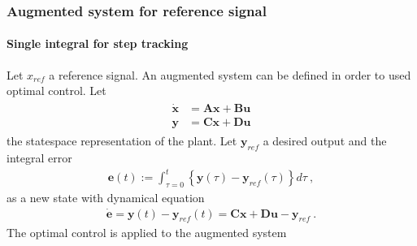 \documentclass[letterpaper,10pt,english]{jupyterBook}
\begin{document}
\subsubsection{Augmented system for reference signal}
\label{\detokenize{ch/control/optimal-control-ref-tracking-example:augmented-system-for-reference-signal}}

\paragraph{Single integral for step tracking}
\label{\detokenize{ch/control/optimal-control-ref-tracking-example:single-integral-for-step-tracking}}
\sphinxAtStartPar
Let \(x_{ref}\) a reference signal. An augmented system can be defined in order to used optimal control. Let
\begin{equation*}
\begin{split}\begin{aligned}
 \dot{\mathbf{x}} & = \mathbf{A} \mathbf{x} + \mathbf{B} \mathbf{u} \\
      \mathbf{y}  & = \mathbf{C} \mathbf{x} + \mathbf{D} \mathbf{u}
\end{aligned}\end{split}
\end{equation*}
\sphinxAtStartPar
the state\sphinxhyphen{}space representation of the plant. Let \(\mathbf{y}_{ref}\) a desired output and the integral error
\begin{equation*}
\begin{split}\mathbf{e}(t) := \int_{\tau=0}^{t} \left\{ \mathbf{y}(\tau) - \mathbf{y}_{ref}(\tau) \right\} d \tau \ ,\end{split}
\end{equation*}
\sphinxAtStartPar
as a new state with dynamical equation
\begin{equation*}
\begin{split}\dot{\mathbf{e}} = \mathbf{y}(t) - \mathbf{y}_{ref}(t) = \mathbf{C} \mathbf{x} + \mathbf{D} \mathbf{u} - \mathbf{y}_{ref} \ .\end{split}
\end{equation*}
\sphinxAtStartPar
The optimal control is applied to the augmented system
\end{document}
